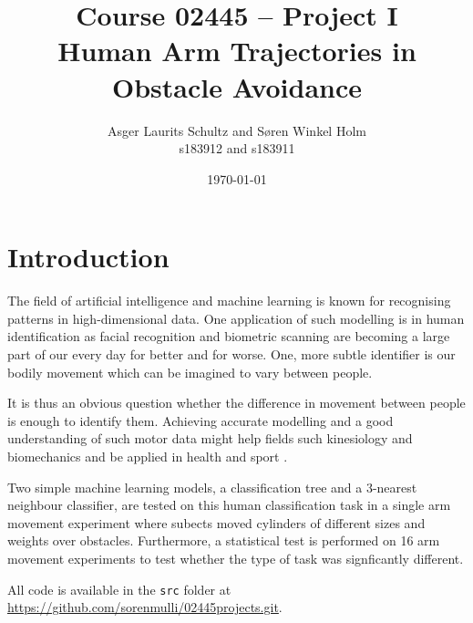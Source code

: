 \documentclass[11pt,fleqn]{article}
\title{Course 02445 -- Project I\\Human Arm Trajectories in Obstacle Avoidance}
\author{Asger Laurits Schultz and Søren Winkel Holm\\s183912 and s183911}
\date{\today}
\begin{document}
\maketitle
\tableofcontents
\newpage 


\section{Introduction}
The field of artificial intelligence and machine learning is known for recognising patterns in high-dimensional data. 
One application of such modelling is in human identification as facial recognition and biometric scanning are becoming a large part of our every day for better and for worse. One, more subtle identifier is our bodily movement which can be imagined to vary between people.

It is thus an obvious question whether the difference in movement between people is enough to identify them. Achieving accurate modelling and a good understanding of such motor data might help fields such kinesiology and biomechanics and be applied in health and sport \cite{kine}.

Two simple machine learning models, a classification tree and a 3-nearest neighbour classifier, are tested on this human classification task in a single arm movement experiment where subects moved cylinders of different sizes and weights over obstacles. Furthermore, a statistical test is performed on 16 arm movement experiments to test whether the type of task was signficantly different.

All code is available in the \texttt{src} folder at \url{https://github.com/sorenmulli/02445projects.git}.
\end{document}
